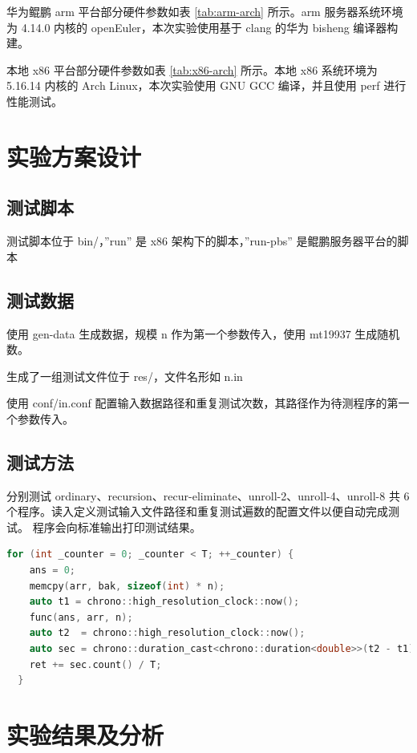 \documentclass[a4paper]{article}
\begin{document}
华为鲲鹏 arm 平台部分硬件参数如表 \ref{tab:arm-arch} 所示。arm 服务器系统环境为 4.14.0 内核的 openEuler，本次实验使用基于 clang 的华为 bisheng 编译器构建。

本地 x86 平台部分硬件参数如表 \ref{tab:x86-arch} 所示。本地 x86 系统环境为 5.16.14 内核的 Arch Linux，本次实验使用 GNU GCC 编译，并且使用 perf 进行性能测试。

\section{实验方案设计}
\subsection{测试脚本}
测试脚本位于 bin/，''run'' 是 x86 架构下的脚本，''run-pbs'' 是鲲鹏服务器平台的脚本

\subsection{测试数据}
使用 gen-data 生成数据，规模 n 作为第一个参数传入，使用 mt19937 生成随机数。

生成了一组测试文件位于 res/，文件名形如 n.in

使用 conf/in.conf 配置输入数据路径和重复测试次数，其路径作为待测程序的第一个参数传入。

\subsection{测试方法}
分别测试 ordinary、recursion、recur-eliminate、unroll-2、unroll-4、unroll-8 共 6 个程序。读入定义测试输入文件路径和重复测试遍数的配置文件以便自动完成测试。
程序会向标准输出打印测试结果。

\begin{lstlisting}[title=重复测试代码,frame=trbl,language={C++}]
  for (int _counter = 0; _counter < T; ++_counter) {
    ans = 0;
    memcpy(arr, bak, sizeof(int) * n);
    auto t1 = chrono::high_resolution_clock::now();
    func(ans, arr, n);
    auto t2  = chrono::high_resolution_clock::now();
    auto sec = chrono::duration_cast<chrono::duration<double>>(t2 - t1);
    ret += sec.count() / T;
  }
\end{lstlisting}

\section{实验结果及分析}
\end{document}
